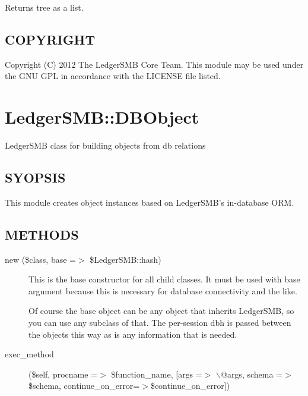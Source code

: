 \begin{description}
\begin{description}
Returns tree as a list.

\end{description}
\subsection*{COPYRIGHT\label{LedgerSMB::DBObject::Business_Unit_Class_COPYRIGHT}}


Copyright (C) 2012 The LedgerSMB Core Team.  This module may be used under the
GNU GPL in accordance with the LICENSE file listed.

\section{LedgerSMB::DBObject\label{LedgerSMB::DBObject}}


LedgerSMB class for building objects from db relations

\subsection*{SYOPSIS\label{LedgerSMB::DBObject_SYOPSIS}}


This module creates object instances based on LedgerSMB's in-database ORM.

\subsection*{METHODS\label{LedgerSMB::DBObject_METHODS}}
\begin{description}

\item[{new (\$class, base =$>$ \$LedgerSMB::hash)}] \mbox{}

This is the base constructor for all child classes.  It must be used with base
argument because this is necessary for database connectivity and the like.



Of course the base object can be any object that inherits LedgerSMB, so you can
use any subclass of that.  The per-session dbh is passed between the objects 
this way as is any information that is needed.


\item[{exec\_method}] \mbox{}

(\$self, procname =$>$ \$function\_name, [args =$>$ $\backslash$@args, schema =$>$ \$schema,
continue\_on\_error=$>$\$continue\_on\_error])




\end{description}
\end{description}
